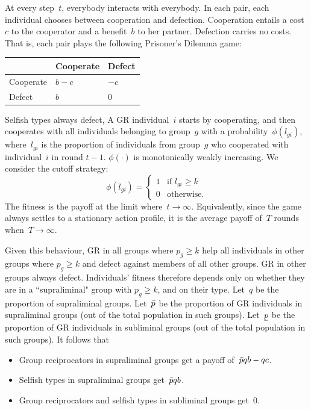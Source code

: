 \documentclass[12pt,a4paper]{article}
\begin{document}
At every step~$t$, everybody interacts with everybody. In each pair, each individual chooses between cooperation and defection. Cooperation entails a cost~$c$ to the cooperator and a benefit~$b$ to her partner. Defection carries no costs. That is, each pair plays the following Prisoner's Dilemma game:
\begin{center}
    \begin{tabularx}{0.5\textwidth}{|x|x|x|}
        \hline
        &   Cooperate   &   Defect  \\
        \hline
        Cooperate   &   $b-c$   &   $-c$    \\
        \hline
        Defect  &   $b$ &   $0$   \\
        \hline
    \end{tabularx}
\end{center}

Selfish types always defect, A GR individual~$i$ starts by cooperating, and then cooperates with all individuals belonging to group~$g$ with a probability~$\phi(l_{gi})$, where~$l_{gi}$ is the proportion of individuals from group~$g$ who cooperated with individual~$i$ in round $t-1$.
$\phi(\cdot)$ is monotonically weakly increasing. We consider the cutoff strategy: 
$$
    \phi(l_{gi}) =
    \begin{cases}
        1   &   \text{if } l_{gi} \geq k  \\
        0   &   \text{otherwise.}
    \end{cases}
$$
The fitness is the payoff at the limit where~$t\to\infty$. Equivalently, since the game always settles to a stationary action profile, it is the average payoff of~$T$ rounds when~$T\to\infty$.

Given this behaviour, GR in all groups where $p_g \geq k$ help all individuals in other groups where $p_g \geq k$ and defect against members of all other groups. GR in other groups always defect.
%
Individuals' fitness therefore depends only on whether they are in a ``supraliminal" group with $p_g \geq k$, and on their type. Let~$q$ be the 
proportion of supraliminal groups. Let~$\bar{p}$ be the proportion of 
GR individuals in supraliminal groups (out of the total population in such groups). Let~$\underline{p}$ be the proportion of GR individuals in subliminal groups (out of the total population in such groups). It follows that
\begin{itemize}
    \item Group reciprocators in supraliminal groups get a payoff of~$\bar{p} qb - qc$.
    \item Selfish types in supraliminal groups get~$\bar{p} qb$.
    \item Group reciprocators and selfish types in subliminal groups get~$0$.
\end{itemize}
\end{document}
